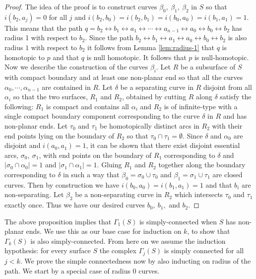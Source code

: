 \documentclass[11pt]{article}
\def\lr{\leftrightarrow}
\def\a{\alpha}
\def\b{\beta}
\begin{document}
\begin{proof}
  The idea of the proof is to construct curves $\b_0,\ \b_1,\ \b_2$ in $S$ so that $i(b_2,a_j) = 0$ for all $j$ and $i(b_2,b_0) = i(b_2,b_1)= i(b_0,a_0) = i(b_1,a_1) = 1$. This means that the path $q= b_2 \lr b_1 \lr a_1 \lr \cdots \lr a_{n-1}\lr a_0 \lr b_0 \lr b_2$ has radius 1 with respect to $b_2$. Since the path $b_2\lr b_1\lr a_1 \lr a_0\lr b_0\lr b_2$ is also radius $1$ with respect to $b_2$ it follows from Lemma \ref{lem:radius-1} that $q$ is homotopic to $p$ and that $q$ is null homotopic. It follows that $p$ is null-homotopic.\\


  Now we describe the construction of the curves $\b_i$. Let $R$ be a subsurface of $S$ with compact boundary and at least one non-planar end so that all the curves $\a_0,\cdots, \a_{n-1}$ are contained in $R$. Let $\delta$ be a separating curve in $R$ disjoint from all $\a_i$ so that the two surfaces, $R_1$ and $R_2$, obtained by cutting $R$ along $\delta$ satisfy the following: $R_1$ is compact and contains all $\a_i$ and $R_2$ is of infinite-type with a single compact boundary component corresponding to the curve $\delta$ in $R$ and has non-planar ends. Let $\tau_0$ and $\tau_1$ be homotopically distinct arcs in $R_2$ with their end points lying on the boundary of $R_2$ so that $\tau_0\cap \tau_1 = \emptyset$. Since $\delta$ and $\a_0$ are disjoint and $i(a_0,a_1)=1$, it can be shown that there exist disjoint essential arcs, $\sigma_0,\ \sigma_1$, with end points on the boundary of $R_1$ corresponding to $\delta$ and $|\sigma_0\cap \a_0| = 1$ and $|\sigma_1\cap \a_1|=1$. Gluing $R_1$ and $R_2$ together along the boundary corresponding to $\delta$ in such a way that $\beta_0 = \sigma_0\cup \tau_0$ and $\beta_1 = \sigma_1\cup \tau_1$ are closed curves. Then by construction we have $i(b_0,a_0) = i(b_1,a_1) = 1$ and that $b_i$ are non-separating. Let $\b_2$ be a non-separating curve in $R_2$ which intersects $\tau_0$ and $\tau_1$ exactly once. Thus we have our desired curves $b_0,\ b_1,$ and $b_2$.
\end{proof}
The above proposition implies that $\Gamma_1(S)$ is simply-connected when $S$ has non-planar ends. We use this as our base case for induction on $k$, to show that $\Gamma_k(S)$ is also simply-connected. From here on we assume the induction hypothesis: for every surface $S$ the complex $\Gamma_j(S)$ is simply connected for all $j<k$. We prove the simple connectedness now by also inducting on radius of the path. We start by a special case of radius 0 curves.
\end{document}
